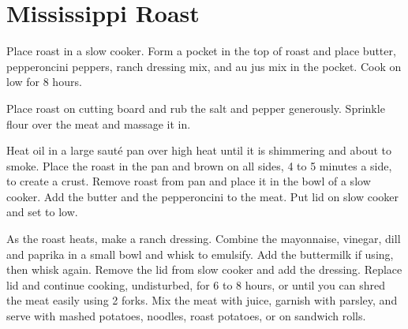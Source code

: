 \section{Mississippi Roast}
\begin{recipe}




	Place roast in a slow cooker. Form a pocket in the top of roast and place butter, pepperoncini peppers, ranch dressing mix, and au jus mix in the pocket. Cook on low for 8 hours.

	Place roast on cutting board and rub the salt and pepper generously. Sprinkle flour over the meat and massage it in.

	Heat oil in a large saut\'{e} pan over high heat until it is shimmering and about to smoke. Place the roast in the pan and brown on all sides, 4 to 5 minutes a side, to create a crust. Remove roast from pan and place it in the bowl of a slow cooker. Add the butter and the pepperoncini to the meat. Put lid on slow cooker and set to low.

	As the roast heats, make a ranch dressing. Combine the mayonnaise, vinegar, dill and paprika in a small bowl and whisk to emulsify. Add the buttermilk if using, then whisk again. Remove the lid from slow cooker and add the dressing. Replace lid and continue cooking, undisturbed, for 6 to 8 hours, or until you can shred the meat easily using 2 forks. Mix the meat with juice, garnish with parsley, and serve with mashed potatoes, noodles, roast potatoes, or on sandwich rolls.


\end{recipe}
